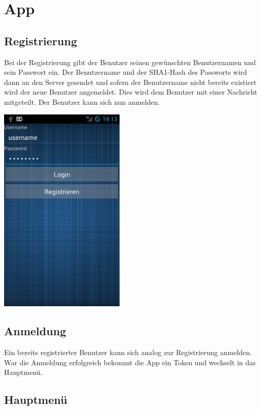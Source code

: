 \chapter{App}
\section{Registrierung}
Bei der Registrierung gibt der Benutzer seinen gewünschten Benutzernamen und sein Passwort ein. Der Benutzername und der SHA1-Hash des Passworts wird dann an den Server gesendet und sofern der Benutzername nicht bereits existiert wird der neue Benutzer angemeldet. Dies wird dem Benutzer mit einer Nachricht mitgeteilt. Der Benutzer kann sich nun anmelden.

\begin{capfigure}
	\includegraphics[width=6cm]{images/app/login}
\end{capfigure}


\section{Anmeldung}
Ein bereits registrierter Benutzer kann sich analog zur Registrierung anmelden. War die Anmeldung erfolgreich bekommt die App ein Token und wechselt in das Hauptmenü.

\section{Hauptmenü}

